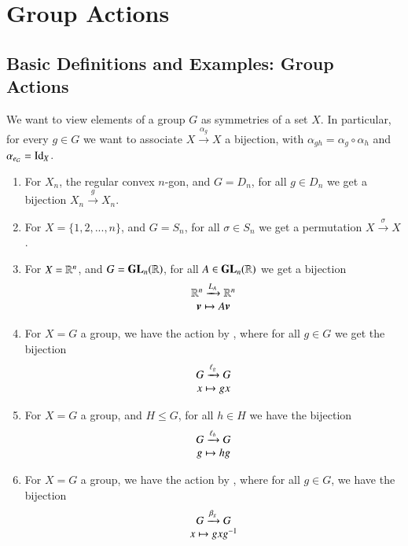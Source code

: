 \chapter{ Group Actions}
\label{GrpActions}
\section{ Basic Definitions and Examples: Group Actions}

\begin{remark}[Motivation]
        We want to view elements of a group $G$ as symmetries of a set $X$. In particular, for every $g \in G$ we want to associate $X \xrightarrow{\alpha_g} X$ a bijection, with $\alpha_{gh} = \alpha_g \circ \alpha_h$ and $\alpha_{e_G} = \operatorname{Id}_X$.
\end{remark}

\begin{example}
        \leavevmode
        \begin{enumerate}
                \item For $X_n$, the regular convex $n$-gon, and $G = D_n$, for all $g \in D_n$ we get a bijection $X_n \xrightarrow{g} X_n$.
                \item For $X = \{1,2,...,n\}$, and $G = S_n$, for all $\sigma \in S_n$ we get a permutation $X \xrightarrow{\sigma} X$.
                \item For $X = \mathbb R^n$, and $G = \mathbf{GL}_n(\mathbb R)$, for all $A \in \mathbf{GL}_n(\mathbb R)$ we get a bijection \begin{equation}
                                \map{\R^n\xrightarrow{L_A}\R^n}{\vec{v} \mapsto A\vec{v}}
                \end{equation}
                \item For $X = G$ a group, we have the action by , where for all $g \in G$ we get the bijection \begin{equation}
                                \begin{array}{c} G\xrightarrow{\ell_g}G \\ x\mapsto gx \end{array}
                \end{equation}
                \item For $X = G$ a group, and $H \leq G$, for all $h \in H$ we have the bijection \begin{equation}
                                \begin{array}{c} G \xrightarrow{\ell_h} G \\ g \mapsto hg \end{array}
                \end{equation}
                \item For $X = G$ a group, we have the action by , where for all $g \in G$, we have the bijection \begin{equation}
                                \begin{array}{c} G\xrightarrow{\beta_g}G \\ x\mapsto gxg^{-1} \end{array}
                \end{equation}
        \end{enumerate}
\end{example}


